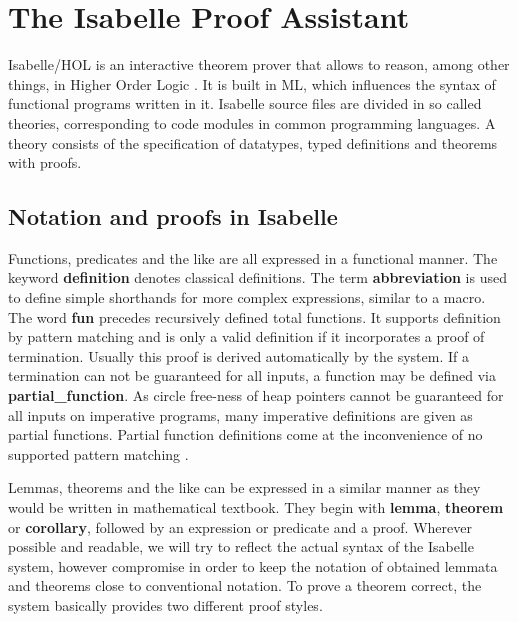 

\section{The Isabelle Proof Assistant}

Isabelle/HOL is an interactive theorem prover that allows
to reason, among other things,
in Higher Order Logic \parencite{DBLP:books/sp/NipkowPW02}.
It is built in ML, which influences the syntax of functional
programs written in it.
Isabelle source files are divided in so called theories,
corresponding to code modules in common programming languages.
A theory consists of the specification of datatypes,
typed definitions and theorems with proofs.

\subsection{Notation and proofs in Isabelle}

Functions, predicates and the like are all expressed in
a functional manner.
The keyword \textbf{definition} denotes classical definitions.
The term \textbf{abbreviation} is used to define simple shorthands for more complex expressions,
similar to a macro.
The word \textbf{fun} precedes recursively defined total functions.
It supports definition by pattern matching and
is only a valid definition if it incorporates a proof of termination.
Usually this proof is derived automatically by the system.
If a termination can not be guaranteed for all inputs,
a function may be defined via \textbf{partial\_function}.
As circle free-ness of heap pointers cannot be guaranteed for all inputs
on imperative programs, many imperative definitions are given
as partial functions.
Partial function definitions come at the inconvenience of no
supported pattern matching \parencite{isabelleManual}.

Lemmas, theorems and the like can be expressed in a similar manner
as they would be written in mathematical textbook.
They begin with \textbf{lemma}, \textbf{theorem} or \textbf{corollary},
followed by an expression or predicate and a proof.
Wherever possible and readable, we will try to reflect the actual
syntax of the Isabelle system, however compromise in order to
keep the notation of obtained lemmata and theorems
close to conventional notation.
To prove a theorem correct, the system basically provides two different
proof styles.


